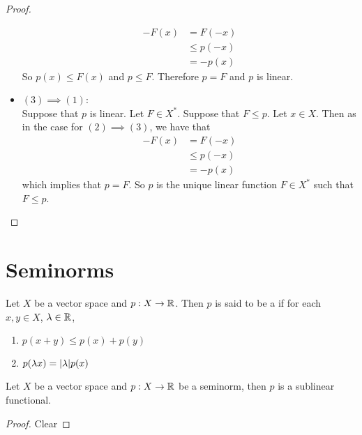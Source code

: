 \documentclass{book}
\begin{document}
\begin{proof}
\begin{itemize}
			\begin{align*}
				-F(x) 
				&= F(-x) \\
				& \leq p(-x) \\
				&= -p(x)
			\end{align*}	
			So $p(x) \leq F(x)$ and $p \leq F$. Therefore $p = F$ and $p$ is linear.  
			\item $(3) \implies (1)$: \\ 
			Suppose that $p$ is linear. Let $F \in X^*$. Suppose that $F \leq p$. Let $x \in X$. Then as in the case for $(2) \implies (3)$, we have that
			\begin{align*}
				-F(x) 
				&= F(-x) \\
				& \leq p(-x) \\
				&= -p(x)
			\end{align*}	 
			which implies that $p = F$. So $p$ is the unique linear function $F \in X^*$ such that $F \leq p$.
		\end{itemize}
	\end{proof}
	






















	\newpage
	\section{Seminorms}
	\begin{defn} 
		Let $X$ be a vector space and $p:X \rightarrow \mathbb{R}$. Then $ p$ is said to be a  if for each $x,y \in X$, $\lambda \in \mathbb{R}$, 
		\begin{enumerate}
			\item $p(x+y) \leq p(x) + p(y)$
			\item $p(\lambda x) = |\lambda| p(x)$
		\end{enumerate}  
	\end{defn}
	
	\begin{ex} 
		Let $X$ be a vector space and $p: X \rightarrow \mathbb{R}$ be a seminorm, then $p$ is a sublinear functional.
	\end{ex}
	
	\begin{proof}
		Clear
	\end{proof}
\end{document}
